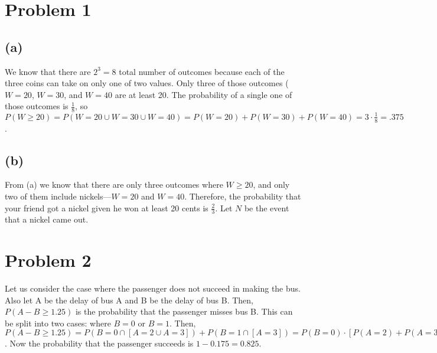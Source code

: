 \documentclass{article}
\begin{document}
\thispagestyle{fancy}

\list{} \item \endlist

\section*{Problem 1} 

\subsection*{(a)}

We know that there are $2^{3} = 8$ total number of outcomes because each of the
three coins can take on only one of two values. Only three of those outcomes
($W = 20$, $W = 30$, and $W=40$ are at least 20. The probability of a single
one of those outcomes is $\frac{1}{8}$, so $P(W \geq 20)=P( W = 20 \cup W=30
\cup W=40 )=P( W = 20 ) + P( W = 30 ) + P( W = 40 ) = 3 \cdot \frac{1}{8} =
.375$.

\subsection*{(b)}

From (a) we know that there are only three outcomes where $W \geq 20$, and only
two of them include nickels---$W = 20$ and $W = 40$. Therefore, the probability
that your friend got a nickel given he won at least 20 cents is $\frac{2}{3}$.
Let $N$ be the event that a nickel came out.

\section*{Problem 2}

Let us consider the case where the passenger does not succeed in making the
bus. Also let A be the delay of bus A and B be the delay of bus B. Then, $P(A -
B \geq 1.25)$ is the probability that the passenger misses bus B. This can be
split into two cases: where $B = 0$ or $B = 1$. Then, $P( A - B \geq 1.25 ) =
P( B = 0 \cap [A = 2 \cup A = 3] ) + P( B = 1 \cap [A = 3]) = P(B=0)\cdot [P(A
= 2 ) + P( A = 3 ) ] + P(B=1)\cdot P(A = 3 ) = 0.5\cdot (0.15 + 0.1) + 0.5\cdot
0.1 = 0.175$. Now the probability that the passenger succeeds is $1 - 0.175 =
0.825$.
\end{document}
